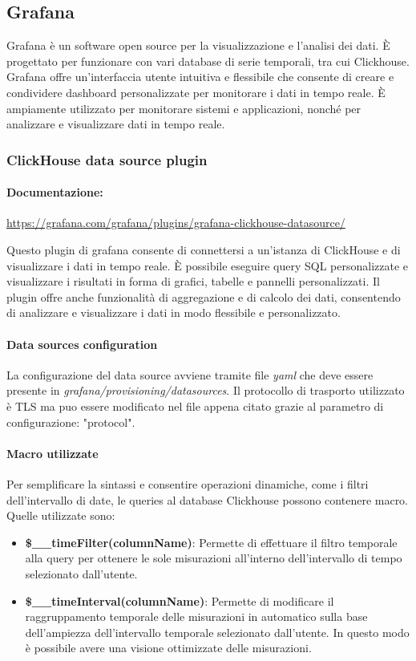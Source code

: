 \subsection{Grafana}
Grafana è un software open source per la visualizzazione e l'analisi dei dati. È progettato per funzionare con vari database di serie temporali, tra cui Clickhouse. Grafana offre un'interfaccia utente intuitiva e flessibile che consente di creare e condividere dashboard personalizzate per monitorare i dati in tempo reale. È ampiamente utilizzato per monitorare sistemi e applicazioni, nonché per analizzare e visualizzare dati in tempo reale.

\subsubsection{ClickHouse data source plugin}
\paragraph{Documentazione:} \href{https://grafana.com/grafana/plugins/grafana-clickhouse-datasource/}{https://grafana.com/grafana/plugins/grafana-clickhouse-datasource/}

Questo plugin di grafana consente di connettersi a un'istanza di ClickHouse e di visualizzare i dati in tempo reale. È possibile eseguire query SQL personalizzate e visualizzare i risultati in forma di grafici, tabelle e pannelli personalizzati. Il plugin offre anche funzionalità di aggregazione e di calcolo dei dati, consentendo di analizzare e visualizzare i dati in modo flessibile e personalizzato.

\paragraph{Data sources configuration}
La configurazione del data source avviene tramite file \textit{yaml} che deve essere presente in \textit{grafana/provisioning/datasources}.
Il protocollo di trasporto utilizzato è TLS ma puo essere modificato nel file appena citato grazie al parametro di configurazione: "protocol".

\paragraph{Macro utilizzate}
Per semplificare la sintassi e consentire operazioni dinamiche, come i filtri dell'intervallo di date, le queries al database Clickhouse possono contenere macro.
Quelle utilizzate sono:
\begin{itemize}
    \item \textbf{\$\_\_timeFilter(columnName)}: Permette di effettuare il filtro temporale alla query per ottenere le sole misurazioni all'interno dell'intervallo di tempo selezionato dall'utente.
    \item  \textbf{\$\_\_timeInterval(columnName)}: Permette di modificare il raggruppamento temporale delle misurazioni in automatico sulla base dell'ampiezza dell'intervallo temporale selezionato dall'utente.
    In questo modo è possibile avere una visione ottimizzate delle misurazioni.
\end{itemize}

